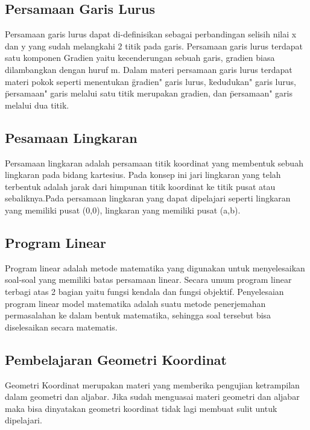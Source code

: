  \subsection{Persamaan Garis Lurus}
 Persamaan garis lurus dapat di-definisikan sebagai perbandingan selisih nilai x dan y yang sudah melangkahi 2 titik pada garis. 
 Persamaan garis lurus terdapat satu komponen Gradien yaitu kecenderungan sebuah garis, gradien biasa dilambangkan dengan huruf m.
 Dalam materi persamaan garis lurus terdapat materi pokok seperti menentukan \"gradien" garis lurus, \"kedudukan" garis lurus,
 \"persamaan" garis melalui satu titik merupakan gradien, dan \"persamaan" garis melalui dua titik.
 
 \subsection{Pesamaan Lingkaran}
 Persamaan lingkaran adalah persamaan titik koordinat yang membentuk sebuah lingkaran pada bidang kartesius. Pada konsep ini jari lingkaran yang telah terbentuk adalah jarak dari himpunan titik koordinat ke titik pusat atau sebaliknya.Pada persamaan lingkaran yang dapat dipelajari seperti lingkaran yang memiliki pusat (0,0), lingkaran yang memiliki pusat (a,b).
 
 \subsection{Program Linear}
 Program linear adalah metode matematika yang digunakan untuk menyelesaikan soal-soal yang memiliki batas persamaan linear. Secara umum program linear terbagi atas 2 bagian yaitu fungsi kendala dan fungsi objektif. Penyelesaian program linear model matematika adalah suatu metode penerjemahan permasalahan ke dalam bentuk matematika, sehingga soal tersebut bisa diselesaikan secara matematis.
 
 \subsection{Pembelajaran Geometri Koordinat}
 Geometri Koordinat merupakan materi yang memberika pengujian ketrampilan dalam geometri dan aljabar.
 Jika sudah menguasai materi geometri dan aljabar maka bisa dinyatakan geometri koordinat tidak lagi membuat sulit untuk dipelajari.